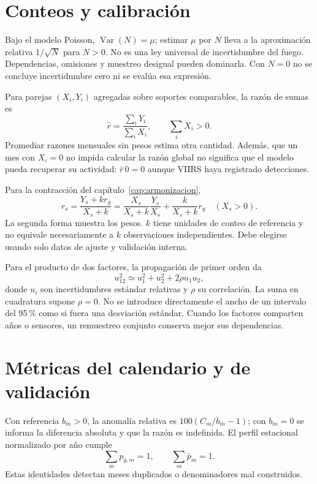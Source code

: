 \section{Conteos y calibración}

Bajo el modelo Poisson, $\operatorname{Var}(N)=\mu$; estimar $\mu$ por $N$ lleva a la
aproximación relativa $1/\sqrt N$ para $N>0$. No es una ley universal de incertidumbre
del fuego. Dependencias, omisiones y muestreo desigual pueden dominarla. Con $N=0$
no se concluye incertidumbre cero ni se evalúa esa expresión.

Para parejas $(X_i,Y_i)$ agregadas sobre soportes comparables, la razón de sumas es
\begin{equation}
 \widehat r=\frac{\sum_iY_i}{\sum_iX_i},\qquad\sum_iX_i>0.
\end{equation}
Promediar razones mensuales sin pesos estima otra cantidad. Además, que un mes con
$X_i=0$ no impida calcular la razón global no significa que el modelo pueda recuperar
su actividad: $\widehat r\,0=0$ aunque VIIRS haya registrado detecciones.

Para la contracción del capítulo~\ref{cap:armonizacion},
\begin{equation}
 r_s=\frac{Y_s+kr_g}{X_s+k}
 =\frac{X_s}{X_s+k}\frac{Y_s}{X_s}
 +\frac{k}{X_s+k}r_g\quad(X_s>0).
\end{equation}
La segunda forma muestra los pesos. $k$ tiene unidades de conteo de referencia y no
equivale necesariamente a $k$ observaciones independientes. Debe elegirse usando solo
datos de ajuste y validación interna.

Para el producto de dos factores, la propagación de primer orden da
\begin{equation}
 u_{12}^2\simeq u_1^2+u_2^2+2\rho u_1u_2,
\end{equation}
donde $u_i$ son incertidumbres estándar relativas y $\rho$ su correlación. La suma en
cuadratura supone $\rho=0$. No se introduce directamente el ancho de un intervalo
del 95\,{}\% como si fuera una desviación estándar. Cuando los factores comparten
años o sensores, un remuestreo conjunto conserva mejor sus dependencias.

\section{Métricas del calendario y de validación}

Con referencia $b_m>0$, la anomalía relativa es $100(C_m/b_m-1)$; con $b_m=0$ se
informa la diferencia absoluta y que la razón es indefinida. El perfil estacional
normalizado por año cumple
\begin{equation}
 \sum_m p_{y,m}=1,\qquad \sum_m\bar p_m=1.
\end{equation}
Estas identidades detectan meses duplicados o denominadores mal construidos.

